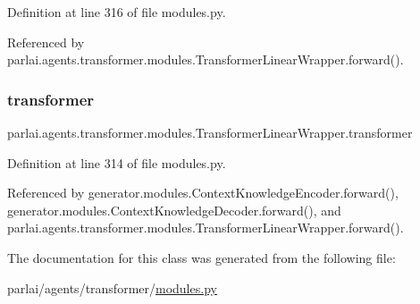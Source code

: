 Definition at line 316 of file modules.\+py.



Referenced by parlai.\+agents.\+transformer.\+modules.\+Transformer\+Linear\+Wrapper.\+forward().

\mbox{\label{classparlai_1_1agents_1_1transformer_1_1modules_1_1TransformerLinearWrapper_acac2d2f099f07b21f792326f90541ffd}} 
\subsubsection{\texorpdfstring{transformer}{transformer}}
{\footnotesize\ttfamily parlai.\+agents.\+transformer.\+modules.\+Transformer\+Linear\+Wrapper.\+transformer}



Definition at line 314 of file modules.\+py.



Referenced by generator.\+modules.\+Context\+Knowledge\+Encoder.\+forward(), generator.\+modules.\+Context\+Knowledge\+Decoder.\+forward(), and parlai.\+agents.\+transformer.\+modules.\+Transformer\+Linear\+Wrapper.\+forward().



The documentation for this class was generated from the following file\+:\begin{DoxyCompactItemize}
\item 
parlai/agents/transformer/\hyperlink{parlai_2agents_2transformer_2modules_8py}{modules.\+py}\end{DoxyCompactItemize}
